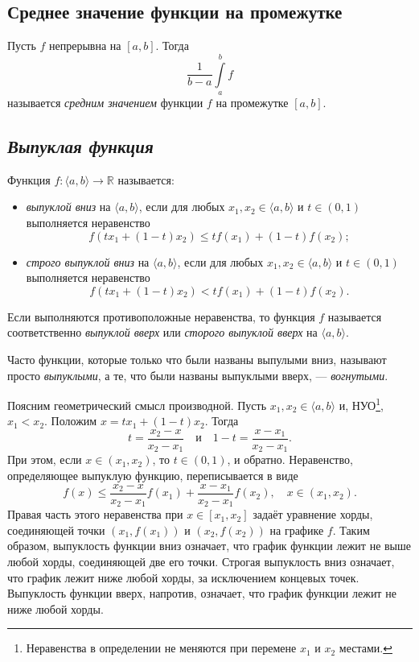 \subsection{Среднее значение функции на промежутке}

\hypertarget{average}{}
\begin{definition}
	Пусть $f$ непрерывна на $[a, b]$. Тогда \[
		\dfrac1{b - a}\int\limits_a^b f
	\]
	называется \textit{средним значением} функции $f$ на промежутке $[a, b]$.
\end{definition}

\subsection{\itshape Выпуклая функция}

\begin{definition}
	Функция \(f \colon \langle a, b \rangle \to \mathbb{R}\) называется:
	\begin{itemize}
		\item \textit{выпуклой вниз} на \(\langle a, b \rangle\), если для любых \(x_1, x_2 \in \langle a, b \rangle\) и \(t \in (0, 1)\) выполняется неравенство \[
		f(t x_1 + (1 - t) x_2) \leqslant t f(x_1) + (1 - t) f(x_2);
		\]
		\item \textit{строго выпуклой вниз} на \(\langle a, b \rangle\), если для любых \(x_1, x_2 \in \langle a, b \rangle\) и \(t \in (0, 1)\) выполняется неравенство \[
		f(t x_1 + (1 - t) x_2) < t f(x_1) + (1 - t) f(x_2).
		\]
	\end{itemize}
	
	Если выполняются противоположные неравенства, то функция \(f\) называется соответственно \textit{выпуклой вверх} или \textit{сторого выпуклой вверх} на \(\langle a, b \rangle\).
	
	Часто функции, которые только что были названы выпулыми вниз, называют просто \textit{выпуклыми}, а те, что были названы выпуклыми вверх, --- \textit{вогнутыми}.
	
	Поясним геометрический смысл производной. Пусть \(x_1, x_2 \in \langle a, b \rangle\) и, НУО\footnote{Неравенства в определении не меняются при перемене \(x_1\) и \(x_2\) местами.}, \(x_1 < x_2\). Положим \(x = t x_1 + (1 - t) x_2\). Тогда \[
		t = \frac{x_2 - x}{x_2 - x_1} \quad \text{и} \quad 1 - t = \frac{x - x_1}{x_2 - x_1}.
	\]
	При этом, если \(x \in (x_1, x_2)\), то \(t \in (0, 1)\), и обратно. Неравенство, определяющее выпуклую функцию, переписывается в виде \[
		f(x) \leqslant \frac{x_2 - x}{x_2 - x_1} f(x_1) + \frac{x - x_1}{x_2 - x_1} f(x_2), \quad x \in (x_1, x_2).
	\]
	Правая часть этого неравенства при \(x \in [x_1, x_2]\) задаёт уравнение хорды, соединяющей точки \((x_1, f(x_1))\) и \((x_2, f(x_2))\) на графике \(f\). Таким образом, выпуклость функции вниз означает, что график функции лежит не выше любой хорды, соединяющей две его точки. Строгая выпуклость вниз означает, что график лежит ниже любой хорды, за исключением концевых точек. Выпуклость функции вверх, напротив, означает, что график функции лежит не ниже любой хорды.
\end{definition}


